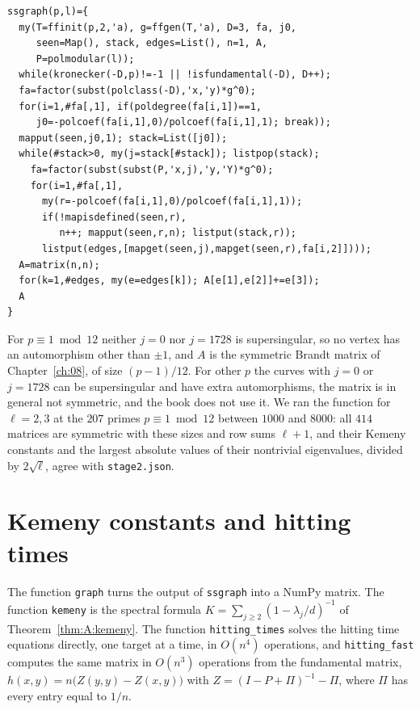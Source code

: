 {\footnotesize
\begin{verbatim}
ssgraph(p,l)={
  my(T=ffinit(p,2,'a), g=ffgen(T,'a), D=3, fa, j0,
     seen=Map(), stack, edges=List(), n=1, A,
     P=polmodular(l));
  while(kronecker(-D,p)!=-1 || !isfundamental(-D), D++);
  fa=factor(subst(polclass(-D),'x,'y)*g^0);
  for(i=1,#fa[,1], if(poldegree(fa[i,1])==1,
     j0=-polcoef(fa[i,1],0)/polcoef(fa[i,1],1); break));
  mapput(seen,j0,1); stack=List([j0]);
  while(#stack>0, my(j=stack[#stack]); listpop(stack);
    fa=factor(subst(subst(P,'x,j),'y,'Y)*g^0);
    for(i=1,#fa[,1],
      my(r=-polcoef(fa[i,1],0)/polcoef(fa[i,1],1));
      if(!mapisdefined(seen,r),
         n++; mapput(seen,r,n); listput(stack,r));
      listput(edges,[mapget(seen,j),mapget(seen,r),fa[i,2]])));
  A=matrix(n,n);
  for(k=1,#edges, my(e=edges[k]); A[e[1],e[2]]+=e[3]);
  A
}
\end{verbatim}
}

For $p\equiv1\bmod12$ neither $j=0$ nor $j=1728$ is supersingular, so no vertex has an automorphism other than $\pm1$, and $A$ is the symmetric Brandt matrix of Chapter~\ref{ch:08}, of size $(p-1)/12$. For other $p$ the curves with $j=0$ or $j=1728$ can be supersingular and have extra automorphisms, the matrix is in general not symmetric, and the book does not use it. We ran the function for $\ell=2,3$ at the $207$ primes $p\equiv1\bmod12$ between $1000$ and $8000$: all $414$ matrices are symmetric with these sizes and row sums $\ell+1$, and their Kemeny constants and the largest absolute values of their nontrivial eigenvalues, divided by $2\sqrt\ell$, agree with \texttt{stage2.json}.

\section{Kemeny constants and hitting times}

The function \texttt{graph} turns the output of \texttt{ssgraph} into a NumPy matrix. The function \texttt{kemeny} is the spectral formula $K=\sum_{j\ge2}(1-\lambda_j/d)^{-1}$ of Theorem~\ref{thm:A:kemeny}. The function \texttt{hitting\_times} solves the hitting time equations directly, one target at a time, in $O(n^4)$ operations, and \texttt{hitting\_fast} computes the same matrix in $O(n^3)$ operations from the fundamental matrix, $h(x,y)=n\bigl(Z(y,y)-Z(x,y)\bigr)$ with $Z=(I-P+\Pi)^{-1}-\Pi$, where $\Pi$ has every entry equal to $1/n$.

